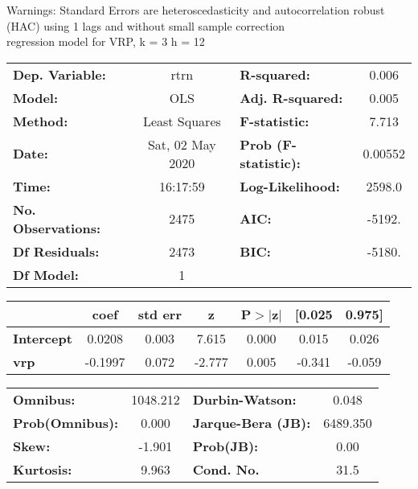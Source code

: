 Warnings: \newline
 [1] Standard Errors are heteroscedasticity and autocorrelation robust (HAC) using 1 lags and without small sample correction\\ 

regression model for VRP, k = 3 h = 12\begin{center}
\begin{tabular}{lclc}
\toprule
\textbf{Dep. Variable:}    &       rtrn       & \textbf{  R-squared:         } &     0.006   \\
\textbf{Model:}            &       OLS        & \textbf{  Adj. R-squared:    } &     0.005   \\
\textbf{Method:}           &  Least Squares   & \textbf{  F-statistic:       } &     7.713   \\
\textbf{Date:}             & Sat, 02 May 2020 & \textbf{  Prob (F-statistic):} &  0.00552    \\
\textbf{Time:}             &     16:17:59     & \textbf{  Log-Likelihood:    } &    2598.0   \\
\textbf{No. Observations:} &        2475      & \textbf{  AIC:               } &    -5192.   \\
\textbf{Df Residuals:}     &        2473      & \textbf{  BIC:               } &    -5180.   \\
\textbf{Df Model:}         &           1      & \textbf{                     } &             \\
\bottomrule
\end{tabular}
\begin{tabular}{lcccccc}
                   & \textbf{coef} & \textbf{std err} & \textbf{z} & \textbf{P$> |$z$|$} & \textbf{[0.025} & \textbf{0.975]}  \\
\midrule
\textbf{Intercept} &       0.0208  &        0.003     &     7.615  &         0.000        &        0.015    &        0.026     \\
\textbf{vrp}       &      -0.1997  &        0.072     &    -2.777  &         0.005        &       -0.341    &       -0.059     \\
\bottomrule
\end{tabular}
\begin{tabular}{lclc}
\textbf{Omnibus:}       & 1048.212 & \textbf{  Durbin-Watson:     } &    0.048  \\
\textbf{Prob(Omnibus):} &   0.000  & \textbf{  Jarque-Bera (JB):  } & 6489.350  \\
\textbf{Skew:}          &  -1.901  & \textbf{  Prob(JB):          } &     0.00  \\
\textbf{Kurtosis:}      &   9.963  & \textbf{  Cond. No.          } &     31.5  \\
\bottomrule
\end{tabular}
\end{center}

